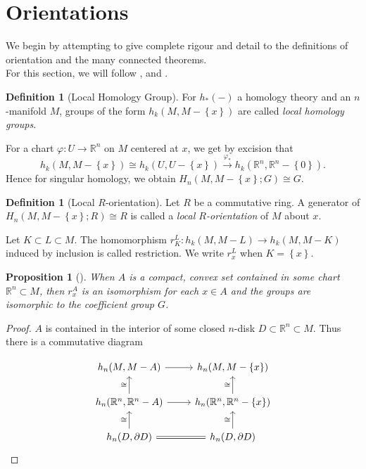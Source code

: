 \documentclass[reqno]{amsart}
\newtheorem{proposition}[theorem]{Proposition}
\theoremstyle{definition}
\newtheorem{definition}[theorem]{Definition}
\theoremstyle{remark}
\begin{document}
\section{Orientations}

We begin by attempting to give complete rigour and detail
to the definitions of orientation and the many connected
theorems.\\
\linebreak
For this section, we will follow 
\cite{Bredon}, \cite{Dieck} and \cite{Dold}.

\begin{definition}[Local Homology Group]
    For $h_*(-)$ a homology theory
    and an $n$-manifold $M$, groups of the form
    $h_k(M , M-\left\{ x \right\} )$ are called
    \textit{local homology groups}.
\end{definition}

For a chart $\varphi  \colon U \to \mathbb{R}^{n}$ 
on $M$ centered at $x$, we get by excision that
\[
h_k(M, M-\left\{ x \right\} ) 
\cong h_k\left( U, U- \left\{ x \right\}  \right) 
\stackrel{\varphi_*}{\to} h_k\left( \mathbb{R}^{n},
\mathbb{R}^{n} - \left\{ 0 \right\} \right) .
\] 
Hence for singular homology, we obtain
$H_n\left( M, M - \left\{ x \right\} ; G \right) 
\cong G$.


\begin{definition}[Local $R$-orientation]
    Let $R$ be a commutative ring.
    A generator of
    $H_n\left( M, M - \left\{ x \right\} ; R \right) 
    \cong R$ is called a 
    \textit{local $R$-orientation} of $M$ about $x$.
\end{definition}

Let $K \subset L \subset M$. The homomorphism
$r_{K}^{L} \colon h_k (M, M-L) \to 
h_k(M, M-K)$ induced by inclusion is
called restriction. We write
$r_{x}^{L}$ when $K = \left\{ x \right\} $.

\begin{proposition}[]\label{Prop:SIDJAV}
    When $A$ is a compact, convex set contained
    in some chart $\mathbb{R}^{n} \subset M$, then
    $r_{x}^{A}$ is an isomorphism for each
    $x \in A$ and the
    groups are isomorphic to the coefficient group
    $G$.
\end{proposition}

\begin{proof}
    $A$ is contained in the interior of some
    closed $n$-disk $D \subset \mathbb{R}^{n} \subset M$.
    Thus there is a commutative diagram

    \begin{equation*}
    \begin{tikzcd}
        h_n(M, M-A) \ar[r] & h_n(M, M- \left\{ x \right\} )\\
        h_n(\mathbb{R}^{n}, \mathbb{R}^{n} - A) 
        \ar[u, "\cong"] \ar[r] & 
        h_n(\mathbb{R}^{n}, \mathbb{R}^{n} - \left\{ x \right\} )
        \ar[u, "\cong"] \\
        h_n(D, \partial D) 
        \ar[u, "\cong"] \ar[r, equal] &
        h_n(D, \partial D) \ar[u, "\cong"]
    \end{tikzcd}
    \end{equation*}
\end{proof}
\end{document}
